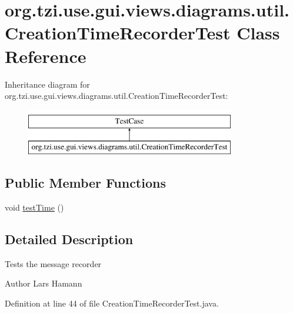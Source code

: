 \hypertarget{classorg_1_1tzi_1_1use_1_1gui_1_1views_1_1diagrams_1_1util_1_1_creation_time_recorder_test}{\section{org.\-tzi.\-use.\-gui.\-views.\-diagrams.\-util.\-Creation\-Time\-Recorder\-Test Class Reference}
\label{classorg_1_1tzi_1_1use_1_1gui_1_1views_1_1diagrams_1_1util_1_1_creation_time_recorder_test}
}
Inheritance diagram for org.\-tzi.\-use.\-gui.\-views.\-diagrams.\-util.\-Creation\-Time\-Recorder\-Test\-:\begin{figure}[H]
\begin{center}
\leavevmode
\includegraphics[height=2.000000cm]{classorg_1_1tzi_1_1use_1_1gui_1_1views_1_1diagrams_1_1util_1_1_creation_time_recorder_test}
\end{center}
\end{figure}
\subsection*{Public Member Functions}
\begin{DoxyCompactItemize}
\item 
void \hyperlink{classorg_1_1tzi_1_1use_1_1gui_1_1views_1_1diagrams_1_1util_1_1_creation_time_recorder_test_a59788b37825e5d5d097b9d8767612e37}{test\-Time} ()
\end{DoxyCompactItemize}


\subsection{Detailed Description}
Tests the message recorder \begin{DoxyAuthor}{Author}
Lars Hamann 
\end{DoxyAuthor}


Definition at line 44 of file Creation\-Time\-Recorder\-Test.\-java.



